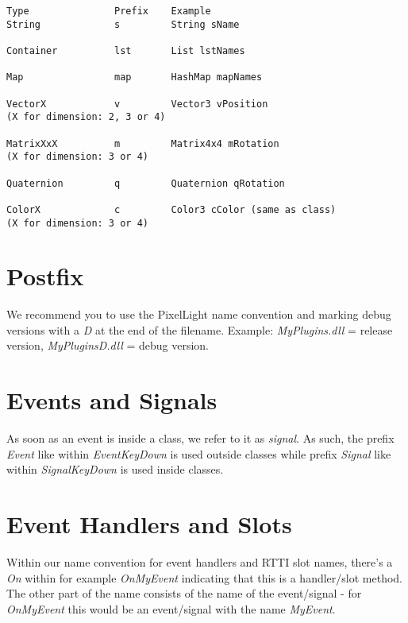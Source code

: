 \begin{lstlisting}[caption=Variable prefixes for PixelLight types]
Type               Prefix    Example
String             s         String sName

Container          lst       List lstNames

Map                map       HashMap mapNames

VectorX            v         Vector3 vPosition
(X for dimension: 2, 3 or 4)

MatrixXxX          m         Matrix4x4 mRotation
(X for dimension: 3 or 4)

Quaternion         q         Quaternion qRotation

ColorX             c         Color3 cColor (same as class)
(X for dimension: 3 or 4)
\end{lstlisting}




\section{Postfix}
We recommend you to use the PixelLight name convention and marking debug versions with a \emph{D} at the end of the filename. Example: \emph{MyPlugins.dll} = release version, \emph{MyPluginsD.dll} = debug version.




\section{Events and Signals}
As soon as an event is inside a class, we refer to it as \emph{signal}. As such, the prefix \emph{Event} like within \emph{EventKeyDown} is used outside classes while prefix \emph{Signal} like within \emph{SignalKeyDown} is used inside classes.




\section{Event Handlers and Slots}
Within our name convention for event handlers and RTTI slot names, there's a \emph{On} within for example \emph{OnMyEvent} indicating that this is a handler/slot method. The other part of the name consists of the name of the event/signal - for \emph{OnMyEvent} this would be an event/signal with the name \emph{MyEvent}.




